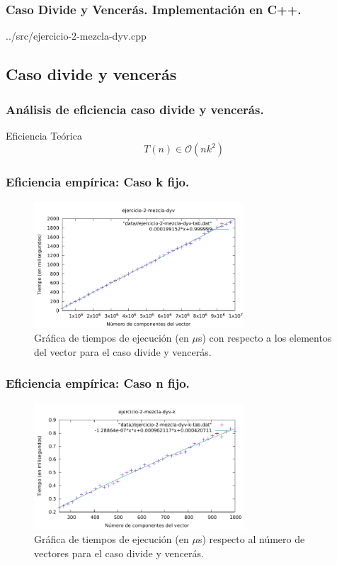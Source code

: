 \documentclass[13pt]{beamer}
\begin{document}
    \begin{frame}
		\frametitle{Caso Divide y Vencerás. Implementación en C++.}
		
		{../src/ejercicio-2-mezcla-dyv.cpp} 
	\end{frame}

    \subsection{Caso divide y vencerás}

    \begin{frame}
		\frametitle{Análisis de eficiencia caso divide y vencerás.}
		 \begin{block}{Eficiencia Teórica}
		 	$$T(n) \in \mathcal{O}(nk^{2})$$
		 \end{block}
	 
	\end{frame}


    \begin{frame}
        \frametitle{Eficiencia empírica: Caso k fijo.}

        \begin{figure}
            \includegraphics[width=0.7\textwidth]{../data/2-dyv/ejercicio-2-mezcla-dyv-graph.pdf}
            \caption{Gráfica de tiempos de ejecución (en $\mu$s) con respecto a los elementos del vector para el caso divide y vencerás.}
        \end{figure}
    \end{frame}

    \begin{frame}
        \frametitle{Eficiencia empírica: Caso n fijo.}

        \begin{figure}
            \includegraphics[width=0.7\textwidth]{../data/2-dyv/ejercicio-2-mezcla-dyv-k-graph.pdf}
            \caption{Gráfica de tiempos de ejecución (en $\mu$s) respecto al número de vectores para el caso divide y vencerás.}
        \end{figure}
    \end{frame}
\end{document}

